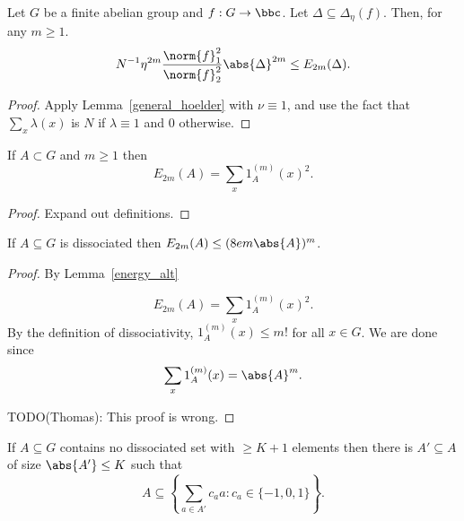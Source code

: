 \begin{lemma}
\label{spec_hoelder}
\leanok
Let $G$ be a finite abelian group and $f:G\to\bbc$. Let $\Delta\subseteq \Delta_\eta(f)$. Then, for any $m\geq 1$.
\[N^{-1}\eta^{2m}\frac{\norm{f}_1^2}{\norm{f}_2^2}\abs{\Delta}^{2m}\leq E_{2m}(\Delta).\]
\end{lemma}

\begin{proof}
\leanok
Apply Lemma~\ref{general_hoelder} with $\nu\equiv 1$, and use the fact that $\sum_x \lambda(x)$ is $N$ if $\lambda\equiv 1$ and $0$ otherwise.
\end{proof}


\begin{lemma}
\label{energy_alt}
\leanok
If $A\subset G$ and $m\geq 1$ then
\[E_{2m}(A) = \sum_x 1_A^{(m)}(x)^2.\]
\end{lemma}

\begin{proof}
\leanok
Expand out definitions.
\end{proof}


\begin{lemma}
\label{diss_energy}
\leanok
If $A\subseteq G$ is dissociated then $E_{2m}(A) \leq (8e m \abs{A})^m$.
\end{lemma}
\begin{proof}
By Lemma~\ref{energy_alt}

\[E_{2m}(A) = \sum_x 1_A^{(m)}(x)^2.\]
By the definition of dissociativity, $1_A^{(m)}(x)\leq m!$ for all $x\in G$. We are done since
\[ \sum_x 1_A^{(m)}(x) = \abs{A}^m.\]

TODO(Thomas): This proof is wrong.
\end{proof}


\begin{lemma}
\label{diss_span}
\leanok
If $A\subseteq G$ contains no dissociated set with $\geq K+1$ elements then there is $A'\subseteq A$ of size $\abs{A'}\leq K$ such that
\[A\subseteq \left\{ \sum_{a\in A'}c_aa : c_a\in \{-1,0,1\} \right\}.\]
\end{lemma}

